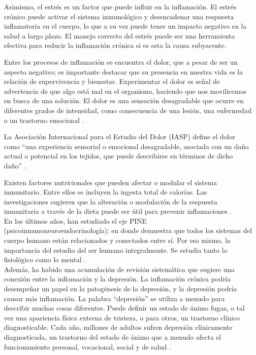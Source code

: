 \documentclass[jou]{apa7}
\begin{document}
	Asimismo, el estrés es un factor que puede influir en la inflamación. El
	estrés crónico puede activar el sistema inmunológico y desencadenar una
	respuesta inflamatoria en el cuerpo, lo que a su vez puede tener un
	impacto negativo en la salud a largo plazo. El manejo correcto del
	estrés puede ser una herramienta efectiva para reducir la inflamación
	crónica si es esta la causa subyacente.

	Entre los procesos de inflamación se encuentra el dolor, que a pesar de
	ser un aspecto negativo; es importante destacar que su presencia en
	nuestra vida es la relación de supervivencia y bienestar. Experimentar
	el dolor es señal de advertencia de que algo está mal en el organismo,
	haciendo que nos movilicemos en busca de una solución. El dolor es una
	sensación desagradable que ocurre en diferentes grados de intensidad,
	como consecuencia de una lesión, una enfermedad o un trastorno emocional
	\parencite{Farlex2023}.


	La Asociación Internacional para el Estudio del Dolor (IASP) define el dolor como ``una experiencia sensorial o emocional desagradable, asociada con un daño actual o potencial en los tejidos, que puede describirse en términos de dicho daño'' \parencite{PainTermsList1979}.


	Existen factores nutricionales que pueden afectar o modular el sistema
	inmunitario. Entre ellos se incluyen la ingesta total de calorías. Las
	investigaciones sugieren que la alteración o modulación de la respuesta
	inmunitaria a través de la dieta puede ser útil para prevenir
	inflamaciones \parencite{GarciaCasal2014}.\\

	En los últimos años, han estudiado el eje PINE
	(psicoinmunoneuroendocrinología); en donde demuestra que todos los
	sistemas del cuerpo humano están relacionados y conectados entre sí. Por
	eso mismo, la importancia del estudio del ser humano integralmente. Se
	estudia tanto lo fisiológico como lo mental \parencite{Osimo2019}.\\

	Además, ha habido una acumulación de revisión sistemática
	que sugiere una conexión entre la inflamación y la depresión. La
	inflamación crónica podría desempeñar un papel en la patogénesis de la
	depresión, y la depresión podría causar más inflamación. La palabra
	``depresión'' se utiliza a menudo para describir muchas cosas
	diferentes. Puede definir un estado de ánimo fugaz, o tal vez una
	apariencia física externa de tristeza, o para otros, un trastorno
	clínico diagnosticable. Cada año, millones de adultos sufren depresión
	clínicamente diagnosticada, un trastorno del estado de ánimo que a
	menudo afecta el funcionamiento personal, vocacional, social y de salud
	\parencite{APA2014}.
\end{document}

